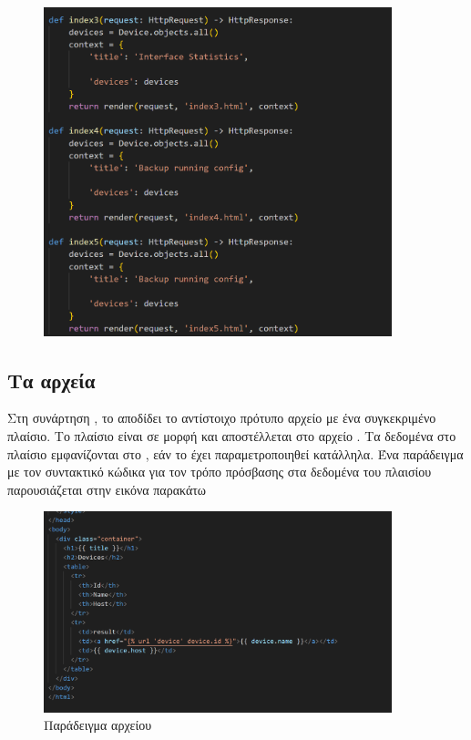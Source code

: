 \begin{figure}[htb]
	\centering
	\includegraphics[width=0.9\textwidth]{graphics/viewspy.png}
	\caption{ }
\end{figure}

\subsection{Τα αρχεία }

Στη συνάρτηση , το  αποδίδει το αντίστοιχο πρότυπο 
αρχείο με ένα συγκεκριμένο πλαίσιο. Το πλαίσιο είναι σε μορφή  και αποστέλλεται στο αρχείο . Τα δεδομένα στο πλαίσιο εμφανίζονται
στο , εάν το  έχει παραμετροποιηθεί κατάλληλα. Ένα παράδειγμα  με
τον συντακτικό κώδικα για τον τρόπο πρόσβασης στα δεδομένα του πλαισίου παρουσιάζεται στην εικόνα παρακάτω



\begin{figure}[htb]
	\centering
	\includegraphics[width=0.9\textwidth]{graphics/html_template.png}
	\caption{Παράδειγμα  αρχείου }
\end{figure}
